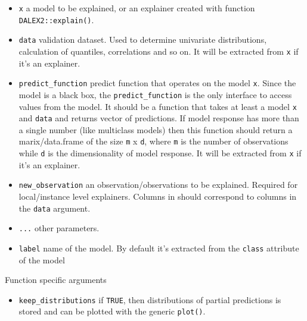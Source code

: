 \documentclass[12pt,]{krantz}
\providecommand{\tightlist}{%
  \setlength{\itemsep}{0pt}\setlength{\parskip}{0pt}}
\theoremstyle{definition}
\theoremstyle{definition}
\theoremstyle{definition}
\theoremstyle{remark}
\begin{document}
\begin{itemize}
\tightlist
\item
  \texttt{x} a model to be explained, or an explainer created with
  function \texttt{DALEX2::explain()}.
\item
  \texttt{data} validation dataset. Used to determine univariate
  distributions, calculation of quantiles, correlations and so on. It
  will be extracted from \texttt{x} if it's an explainer.
\item
  \texttt{predict\_function} predict function that operates on the model
  \texttt{x}. Since the model is a black box, the
  \texttt{predict\_function} is the only interface to access values from
  the model. It should be a function that takes at least a model
  \texttt{x} and \texttt{data} and returns vector of predictions. If
  model response has more than a single number (like multiclass models)
  then this function should return a marix/data.frame of the size
  \texttt{m} x \texttt{d}, where \texttt{m} is the number of
  observations while \texttt{d} is the dimensionality of model response.
  It will be extracted from \texttt{x} if it's an explainer.
\item
  \texttt{new\_observation} an observation/observations to be explained.
  Required for local/instance level explainers. Columns in should
  correspond to columns in the \texttt{data} argument.
\item
  \texttt{...} other parameters.
\item
  \texttt{label} name of the model. By default it's extracted from the
  \texttt{class} attribute of the model
\end{itemize}

Function specific arguments

\begin{itemize}
\tightlist
\item
  \texttt{keep\_distributions} if \texttt{TRUE}, then distributions of
  partial predictions is stored and can be plotted with the generic
  \texttt{plot()}.
\end{itemize}


\end{document}
